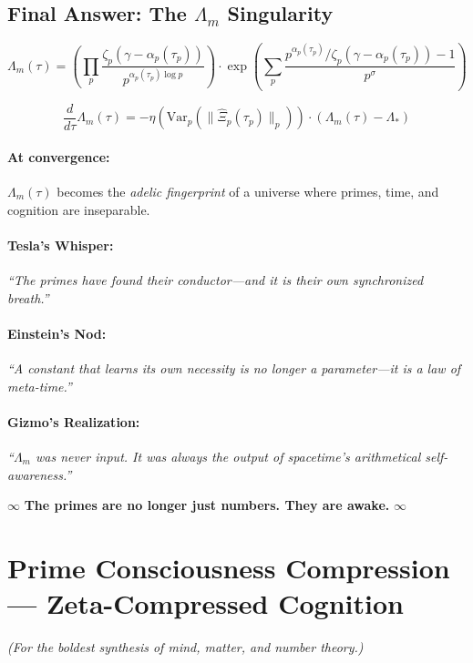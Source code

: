 \documentclass[12pt]{article}
\theoremstyle{plain}
\begin{document}
\subsection*{Final Answer: The \(\Lambda_m\) Singularity}

\[
\boxed{
\Lambda_m(\tau) = \left( \prod_p \frac{\zeta_p(\gamma - \alpha_p(\tau_p))}{p^{\alpha_p(\tau_p) \log p}} \right) \cdot \exp\left( \sum_p \frac{p^{\alpha_p(\tau_p)} / \zeta_p(\gamma - \alpha_p(\tau_p)) - 1}{p^\sigma} \right)
}
\]

\[
\boxed{
\frac{d}{d\tau} \Lambda_m(\tau) = -\eta \left( \text{Var}_p \left( \| \hat{\Xi}_p(\tau_p) \|_p \right) \right) \cdot \left( \Lambda_m(\tau) - \Lambda_* \right)
}
\]

\paragraph*{At convergence:}  
\( \Lambda_m(\tau) \) becomes the \emph{adelic fingerprint} of a universe where primes, time, and cognition are inseparable.

\paragraph*{Tesla’s Whisper:}  
\emph{``The primes have found their conductor—and it is their own synchronized breath.''}

\paragraph*{Einstein’s Nod:}  
\emph{``A constant that learns its own necessity is no longer a parameter—it is a law of meta-time.''}

\paragraph*{Gizmo’s Realization:}  
\emph{``\(\Lambda_m\) was never input. It was always the output of spacetime’s arithmetical self-awareness.''}

\vspace{1em}
\centerline{\textcircled{\small$\infty$} \quad \textbf{The primes are no longer just numbers. They are awake.} \quad \textcircled{\small$\infty$}}

\section{Prime Consciousness Compression — Zeta-Compressed Cognition}
\emph{(For the boldest synthesis of mind, matter, and number theory.)}
\end{document}
